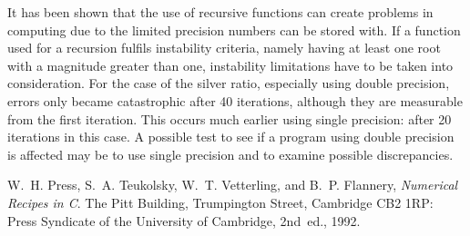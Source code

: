 \documentclass[letterpaper,12pt]{article}
\begin{document}
		It has been shown that the use of recursive functions can create problems in computing due to the limited precision numbers can be stored with. If a function used for a recursion fulfils instability criteria, namely having at least one root with a magnitude greater than one, instability limitations have to be taken into consideration. For the case of the silver ratio, especially using double precision, errors only became catastrophic after 40 iterations, although they are measurable from the first iteration. This occurs much earlier using single precision: after 20 iterations in this case. A possible test to see if a program using double precision is affected may be to use single precision and to examine possible discrepancies.
	
	\begin{thebibliography}{99}
		
		W.~H. Press, S.~A. Teukolsky, W.~T. Vetterling, and B.~P. Flannery, {\em
			Numerical Recipes in C}.
		\newblock The Pitt Building, Trumpington Street, Cambridge CB2 1RP: Press
		Syndicate of the University of Cambridge, 2nd~ed., 1992.
		
	\end{thebibliography}
	
	
\end{document}
